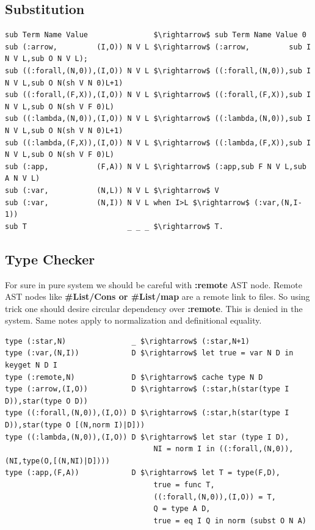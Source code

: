 \documentclass[11pt,oneside]{article}
\begin{document}
\subsection{Substitution}

\begin{lstlisting}[mathescape=true]
sub Term Name Value               $\rightarrow$ sub Term Name Value 0
sub (:arrow,         (I,O)) N V L $\rightarrow$ (:arrow,         sub I N V L,sub O N V L);
sub ((:forall,(N,0)),(I,O)) N V L $\rightarrow$ ((:forall,(N,0)),sub I N V L,sub O N(sh V N 0)L+1)
sub ((:forall,(F,X)),(I,O)) N V L $\rightarrow$ ((:forall,(F,X)),sub I N V L,sub O N(sh V F 0)L)
sub ((:lambda,(N,0)),(I,O)) N V L $\rightarrow$ ((:lambda,(N,0)),sub I N V L,sub O N(sh V N 0)L+1)
sub ((:lambda,(F,X)),(I,O)) N V L $\rightarrow$ ((:lambda,(F,X)),sub I N V L,sub O N(sh V F 0)L)
sub (:app,           (F,A)) N V L $\rightarrow$ (:app,sub F N V L,sub A N V L)
sub (:var,           (N,L)) N V L $\rightarrow$ V
sub (:var,           (N,I)) N V L when I>L $\rightarrow$ (:var,(N,I-1))
sub T                       _ _ _ $\rightarrow$ T.
\end{lstlisting}


\subsection{Type Checker}

For sure in pure system we should be careful with {\bf :remote} AST node. Remote
AST nodes like {\bf \#List/Cons or \#List/map} are a remote link to files. So using
trick one should desire circular dependency over {\bf :remote}. This is denied in
the system. Same notes apply to normalization and definitional equality.

\begin{lstlisting}[mathescape=true]
type (:star,N)               _ $\rightarrow$ (:star,N+1)
type (:var,(N,I))            D $\rightarrow$ let true = var N D in keyget N D I
type (:remote,N)             D $\rightarrow$ cache type N D
type (:arrow,(I,O))          D $\rightarrow$ (:star,h(star(type I D)),star(type O D))
type ((:forall,(N,0)),(I,O)) D $\rightarrow$ (:star,h(star(type I D)),star(type O [(N,norm I)|D]))
type ((:lambda,(N,0)),(I,O)) D $\rightarrow$ let star (type I D),
                                  NI = norm I in ((:forall,(N,0)),(NI,type(O,[(N,NI)|D])))
type (:app,(F,A))            D $\rightarrow$ let T = type(F,D),
                                  true = func T,
                                  ((:forall,(N,0)),(I,O)) = T,
                                  Q = type A D,
                                  true = eq I Q in norm (subst O N A)
\end{lstlisting}
\end{document}
